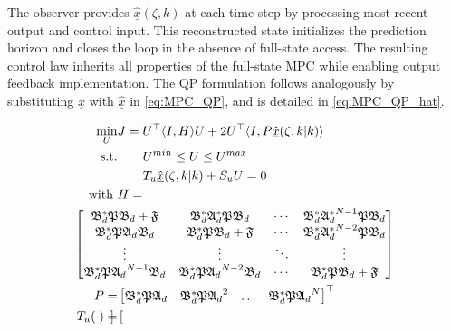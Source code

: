 The observer provides $\underline{\hat{x}}(\zeta,k)$ at each time step by processing most recent output and control input. This reconstructed state initializes the prediction horizon and closes the loop in the absence of full-state access. The resulting control law inherits all properties of the full-state MPC while enabling output feedback implementation. The QP formulation follows analogously by substituting $\underline{x}$ with $\underline{\hat{x}}$ in \eqref{eq:MPC_QP}, and is detailed in \eqref{eq:MPC_QP_hat}.

\begin{equation} \label{eq:MPC_QP_hat}
    \begin{aligned}
        \min_{U} &J = U^\top \langle I,H \rangle U + 2U^\top \langle I, P \underline{\hat{x}}(\zeta, k|k) \rangle \\
        \text{s.t.} &\qquad U^{min} \leq U \leq U^{max} \\
        &\qquad T_u \underline{\hat{x}}(\zeta, k|k) + S_u U = 0
        \, \\
        \text{with } &H = \\
        &\hspace{-3.5em }\begin{bmatrix}
            \mathfrak{B}_d^* \mathfrak{P} \mathfrak{B}_d + \mathfrak{F} & \mathfrak{B}_d^* \mathfrak{A}_d^* \mathfrak{P} \mathfrak{B}_d & \cdots &  \mathfrak{B}_d^* {\mathfrak{A}_d^*}^{N-1} \mathfrak{P} \mathfrak{B}_d \\
            \mathfrak{B}_d^* \mathfrak{P} \mathfrak{A}_d \mathfrak{B}_d & \mathfrak{B}_d^* \mathfrak{P} \mathfrak{B}_d + \mathfrak{F} & \cdots & \mathfrak{B}_d^* {\mathfrak{A}_d^*}^{N-2} \mathfrak{P} \mathfrak{B}_d \\
            \vdots & \vdots & \ddots & \vdots \\
            \mathfrak{B}_d^* \mathfrak{P} {\mathfrak{A}_d}^{N-1} \mathfrak{B}_d & \mathfrak{B}_d^* \mathfrak{P} {\mathfrak{A}_d}^{N-2} \mathfrak{B}_d & \cdots & \mathfrak{B}_d^* \mathfrak{P} \mathfrak{B}_d + \mathfrak{F}
        \end{bmatrix} \\
        P = &\begin{bmatrix}
            \mathfrak{B}_d^* \mathfrak{P} {\mathfrak{A}_d} &
            \mathfrak{B}_d^* \mathfrak{P} {\mathfrak{A}_d}^{2}  &
            \hdots &
            \mathfrak{B}_d^* \mathfrak{P} {\mathfrak{A}_d}^{N} 
        \end{bmatrix}^\top \\
        T_u (\cdot) = &\begin{bmatrix}

\end{bmatrix}
\end{aligned}
\end{equation}
